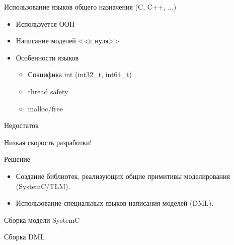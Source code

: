 \begin{frame}{Использование языков общего назначения (C, C++, ...)}

\begin{itemize}
  \item Используется ООП
  \item Написание моделей <<с нуля>>
  \item Особенности языков
  \begin{itemize}
    \item Спацифика int (int32\_t, int64\_t)
    \item thread safety
    \item malloc/free
  \end{itemize}
\end{itemize}

\end{frame}

\begin{frame}{Недостаток}

Низкая скорость разработки!

\end{frame}

\begin{frame}{Решение}

\begin{itemize}
  \item Создание библиотек, реализующих общие примитивы моделирования (SystemC/TLM).
  \item Использование специальных языков написания моделей (DML).
\end{itemize}

\end{frame}

\begin{frame}{Сборка модели SystemC}

\begin{figure}[htp]
    \centering
\end{figure}

\end{frame}

\begin{frame}{Сборка DML}

\begin{figure}[htp]
    \centering
\end{figure}

\end{frame}


